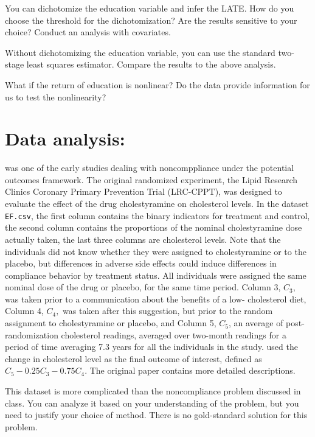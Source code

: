 \documentclass[11pt]{article}
\theoremstyle{definition}
\begin{document}
You can dichotomize the education variable and infer the LATE. How do you choose the threshold for the dichotomization? Are the results sensitive to your choice? Conduct an analysis with covariates. 

Without  dichotomizing the education variable, you can use the standard two-stage least squares estimator. Compare the results to the above analysis.

What if the return of education is nonlinear? Do the data provide information for us to test the nonlinearity?



\section{Data analysis: \citet{efron1991compliance}}

\citet{efron1991compliance} was one of the early studies dealing with noncomppliance under the potential outcomes framework. The original randomized experiment, the Lipid Research Clinics Coronary Primary Prevention Trial (LRC-CPPT), was designed to evaluate the effect of the drug cholestyramine on cholesterol levels.
In the dataset \texttt{EF.csv}, the first column contains the binary indicators for treatment and control, the second column contains the proportions of the nominal cholestyramine dose actually taken, the last three columns are cholesterol levels.
Note that the individuals did not know whether they were assigned to cholestyramine or to the placebo, but differences in adverse side effects could induce differences in compliance behavior by treatment status. All individuals were assigned the same nominal dose of the drug or placebo, for the same time period.
Column 3, $C_3$, was taken prior to a communication about the benefits of a low- cholesterol diet, Column 4, $C_4,$ was taken after this suggestion, but prior to the random assignment to cholestyramine or placebo, and Column 5, $C_5$,  an average of post-randomization cholesterol readings, averaged over two-month readings for a period of time averaging 7.3 years for all the individuals in the study. \citet{efron1991compliance} used the change in cholesterol level as the final outcome of interest, defined as $C_5 - 0.25C_3 - 0.75C_4$. The original paper contains more detailed descriptions. 
 

This dataset is more complicated than the noncompliance problem discussed in class. You can analyze it based on your understanding of the problem, but you need to justify your choice of method. There is no gold-standard solution for this problem. 



\end{document}
